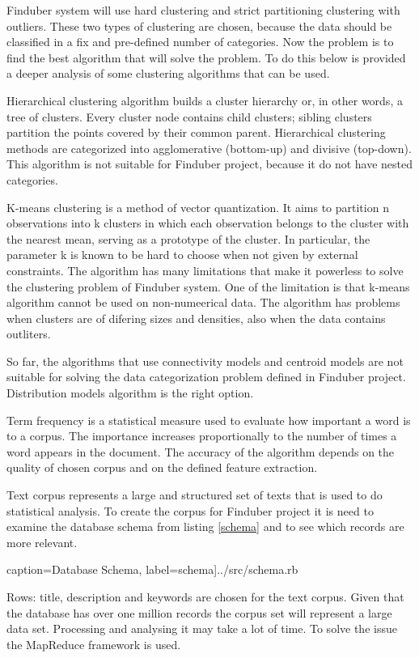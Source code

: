 Finduber system will use hard clustering and strict partitioning clustering with outliers. These two types of clustering are chosen, because the data should be classified in a fix and pre-defined number of categories. Now the problem is to find the best algorithm that will solve the problem. To do this below is provided a deeper analysis of some clustering algorithms that can be used. 

Hierarchical clustering algorithm builds a cluster hierarchy or, in other words, a tree of clusters. Every cluster node contains child clusters; sibling clusters partition the points covered by their common parent. Hierarchical clustering methods are categorized
into agglomerative (bottom-up) and divisive (top-down). This algorithm is not suitable for Finduber project, because it do not have nested categories.

K-means clustering is a method of vector quantization. It aims to partition n observations into k clusters in which each observation belongs to the cluster with the nearest mean, serving as a prototype of the cluster. In particular, the parameter k is known to be hard to choose when not given by external constraints. The algorithm has many limitations that make it powerless to solve the clustering problem of Finduber system. One of the limitation is that k-means algorithm cannot be used on non-numeerical data. The algorithm has problems when clusters are of difering sizes and densities, also when the data contains outliters. 

So far, the algorithms that use connectivity models and centroid models are not suitable for solving the data categorization problem defined in Finduber project. Distribution models algorithm is the right option. 

Term frequency is a statistical measure used to evaluate how important a word is to a corpus. The importance increases proportionally to the number of times a word appears in the document. The accuracy of the algorithm depends on the quality of chosen corpus and on the defined feature extraction. 

Text corpus represents a large and structured set of texts that is used to do statistical analysis. To create the corpus for Finduber project it is need to examine the database schema from listing \ref{schema} and to see which records are more relevant. 

 caption={Database Schema}, label=schema]{../src/schema.rb}

Rows: title, description and keywords are chosen for the text corpus. Given that the database has over one million records the corpus set will represent a large data set. Processing and analysing it may take a lot of time. To solve the issue the MapReduce framework is used. 



